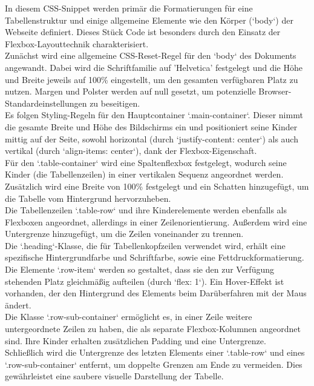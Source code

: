 \documentclass[./dokumentation.tex]{subfiles}
\begin{document}
In diesem CSS-Snippet werden primär die Formatierungen für eine Tabellenstruktur und einige allgemeine Elemente wie den Körper (`body`) der Webseite definiert. Dieses Stück Code ist besonders durch den Einsatz der Flexbox-Layouttechnik charakterisiert.\\
Zunächst wird eine allgemeine CSS-Reset-Regel für den `body` des Dokuments angewandt. Dabei wird die Schriftfamilie auf 'Helvetica' festgelegt und die Höhe und Breite jeweils auf 100\% eingestellt, um den gesamten verfügbaren Platz zu nutzen. Margen und Polster werden auf null gesetzt, um potenzielle Browser-Standardeinstellungen zu beseitigen.\\
Es folgen Styling-Regeln für den Hauptcontainer `.main-container`. Dieser nimmt die gesamte Breite und Höhe des Bildschirms ein und positioniert seine Kinder mittig auf der Seite, sowohl horizontal (durch `justify-content: center`) als auch vertikal (durch `align-items: center`), dank der Flexbox-Eigenschaft.\\
Für den `.table-container` wird eine Spaltenflexbox festgelegt, wodurch seine Kinder (die Tabellenzeilen) in einer vertikalen Sequenz angeordnet werden. Zusätzlich wird eine Breite von 100\% festgelegt und ein Schatten hinzugefügt, um die Tabelle vom Hintergrund hervorzuheben.\\
Die Tabellenzeilen `.table-row` und ihre Kinderelemente werden ebenfalls als Flexboxen angeordnet, allerdings in einer Zeilenorientierung. Außerdem wird eine Untergrenze hinzugefügt, um die Zeilen voneinander zu trennen.\\
Die `.heading`-Klasse, die für Tabellenkopfzeilen verwendet wird, erhält eine spezifische Hintergrundfarbe und Schriftfarbe, sowie eine Fettdruckformatierung. \\
Die Elemente `.row-item` werden so gestaltet, dass sie den zur Verfügung stehenden Platz gleichmäßig aufteilen (durch `flex: 1`). Ein Hover-Effekt ist vorhanden, der den Hintergrund des Elements beim Darüberfahren mit der Maus ändert.\\
Die Klasse `.row-sub-container` ermöglicht es, in einer Zeile weitere untergeordnete Zeilen zu haben, die als separate Flexbox-Kolumnen angeordnet sind. Ihre Kinder erhalten zusätzlichen Padding und eine Untergrenze.\\
Schließlich wird die Untergrenze des letzten Elements einer `.table-row` und eines `.row-sub-container` entfernt, um doppelte Grenzen am Ende zu vermeiden. Dies gewährleistet eine saubere visuelle Darstellung der Tabelle.\\
\end{document}

